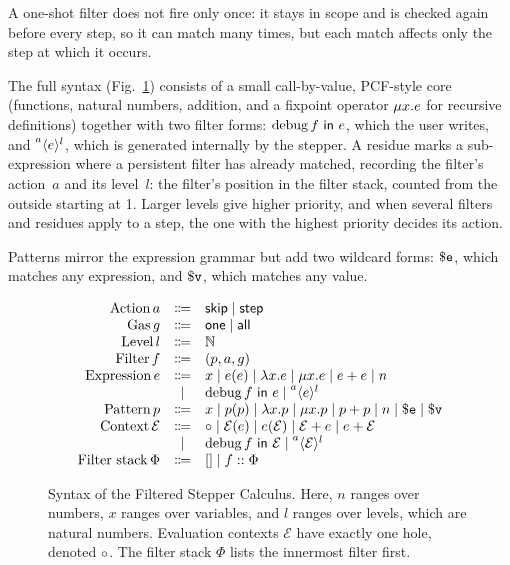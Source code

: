 A one-shot filter does not fire only once: it stays in scope and is
checked again before every step, so it can match many times, but each
match affects only the step at which it occurs.

The full syntax (Fig.~\ref{fig:filter-syntax}) consists of a small
call-by-value, PCF-style core~\cite{plotkin1977lcf} (functions,
natural numbers, addition, and a fixpoint operator \(\Fix{x}{e}\) for
recursive definitions) together with two filter forms:
\(\Filter{f}{e}\), which the user writes, and
\(\Residue{a}{l}{e}\), which is generated internally by the
stepper. A residue marks a sub-expression where a persistent filter
has already matched, recording the filter's action~\(a\) and its
level~\(l\): the filter's position in the filter stack, counted
from the outside starting at 1. Larger levels give higher priority, and
when several filters and residues apply to a step, the one with the
highest priority decides its action.

Patterns mirror the expression grammar but add two wildcard forms:
\(\PatExpr\), which matches any expression, and \(\PatValue\), which
matches any value.

\begin{figure}[h]
  \begin{equation*}
    \begin{array}{rcl}
      \DefAct a    &\Coloneqq& \ActSkip \mid \ActStep \\
      \DefGas g    &\Coloneqq& \GasOne \mid \GasAll \\
      \DefLvl l    &\Coloneqq& \mathbb{N} \\
      \DefFilter f &\Coloneqq& (p, a, g) \\
      \DefExp e    &\Coloneqq& x \mid e(e) \mid \Lam{x}{e} \mid \Fix{x}{e} \mid e + e \mid \Nat{n} \\
                   &\mid     & \Filter{f}{e} \mid \Residue{a}{l}{e} \\
      \DefPat p    &\Coloneqq& x \mid p(p) \mid \Lam{x}{p} \mid \Fix{x}{p} \mid p + p \mid \Nat{n} \mid \PatExpr \mid \PatValue \\
      \DefCtx \mathcal{E} &\Coloneqq& \Mark \mid \mathcal{E}(e) \mid e(\mathcal{E}) \mid \mathcal{E} + e \mid e + \mathcal{E} \\
                   &\mid     & \Filter{f}{\mathcal{E}} \mid \Residue{a}{l}{\mathcal{E}} \\
      \DefFilterStack \Phi &\Coloneqq& [] \mid f::\Phi \\
    \end{array}
  \end{equation*}
  \caption{Syntax of the Filtered Stepper Calculus. Here, $n$ ranges over numbers, $x$ ranges over variables, and $l$ ranges over levels, which are natural numbers. Evaluation contexts $\mathcal{E}$ have exactly one hole, denoted $\Mark$. The filter stack $\Phi$ lists the innermost filter first.}
  \label{fig:filter-syntax}
\end{figure}


